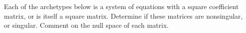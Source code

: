 Each of the archetypes below is a system of equations with a square coefficient matrix, or is itself a square matrix.  Determine if these matrices are nonsingular, or singular.  Comment on the null space of each matrix.\\
\\ 
\\ 
\\ 
\\ 
